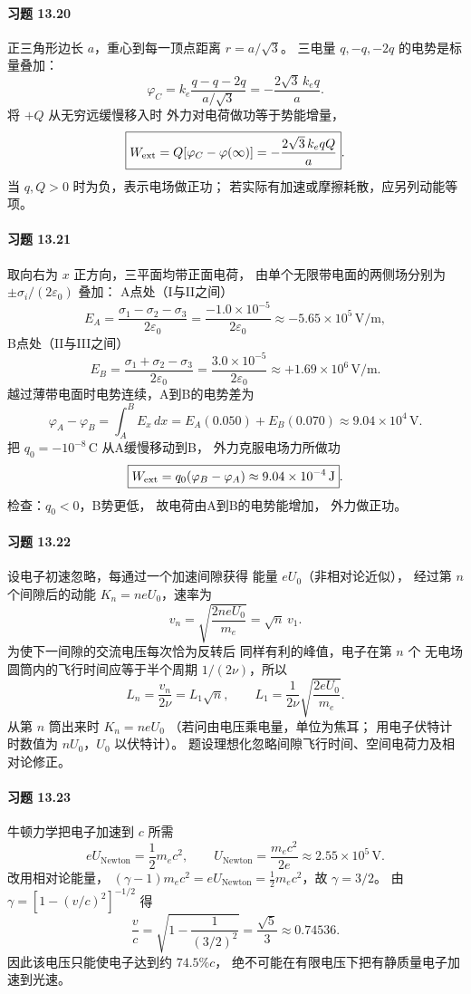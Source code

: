 \paragraph{习题 13.20}
正三角形边长 \(a\)，重心到每一顶点距离
\(r=a/\sqrt3\)。
三电量 \(q,-q,-2q\) 的电势是标量叠加：
\[
 \boxed{\varphi_C=k_e\frac{q-q-2q}{a/\sqrt3}
 =-\frac{2\sqrt3\,k_eq}{a}}.
\]
将 \(+Q\) 从无穷远缓慢移入时
外力对电荷做功等于势能增量，
\[
 \boxed{W_{\rm ext}=Q[\varphi_C-\varphi(\infty)]
 =-\frac{2\sqrt3\,k_eqQ}{a}}.
\]
当 \(q,Q>0\) 时为负，表示电场做正功；
若实际有加速或摩擦耗散，应另列动能等项。

\paragraph{习题 13.21}
取向右为 \(x\) 正方向，三平面均带正面电荷，
由单个无限带电面的两侧场分别为
\(\pm\sigma_i/(2\varepsilon_0)\) 叠加：
A点处（I与II之间）
\[
 E_A=\frac{\sigma_1-\sigma_2-\sigma_3}{2\varepsilon_0}
 =\frac{-1.0\times10^{-5}}{2\varepsilon_0}
 \approx-5.65\times10^5\,\mathrm{V/m},
\]
B点处（II与III之间）
\[
 E_B=\frac{\sigma_1+\sigma_2-\sigma_3}{2\varepsilon_0}
 =\frac{3.0\times10^{-5}}{2\varepsilon_0}
 \approx+1.69\times10^6\,\mathrm{V/m}.
\]
越过薄带电面时电势连续，A到B的电势差为
\[
 \varphi_A-\varphi_B
 =\int_A^BE_x\,dx
 =E_A(0.050)+E_B(0.070)
 \approx\boxed{9.04\times10^4\,\mathrm V}.
\]
把 \(q_0=-10^{-8}\,\mathrm C\) 从A缓慢移动到B，
外力克服电场力所做功
\[
 \boxed{W_{\rm ext}=q_0(\varphi_B-\varphi_A)
 \approx9.04\times10^{-4}\,\mathrm J}.
\]
检查：\(q_0<0\)，B势更低，
故电荷由A到B的电势能增加，
外力做正功。

\paragraph{习题 13.22}
设电子初速忽略，每通过一个加速间隙获得
能量 \(eU_0\)（非相对论近似），
经过第 \(n\) 个间隙后的动能
\(K_n=neU_0\)，速率为
\[
 v_n=\sqrt{\frac{2neU_0}{m_e}}=\sqrt n\,v_1.
\]
为使下一间隙的交流电压每次恰为反转后
同样有利的峰值，电子在第 \(n\) 个
无电场圆筒内的飞行时间应等于半个周期
\(1/(2\nu)\)，所以
\[
 \boxed{L_n=\frac{v_n}{2\nu}
 =L_1\sqrt n},\qquad
 \boxed{L_1=\frac1{2\nu}\sqrt{\frac{2eU_0}{m_e}}}.
\]
从第 \(n\) 筒出来时
\(\boxed{K_n=neU_0}\)
（若问由电压乘电量，单位为焦耳；
用电子伏特计时数值为 \(nU_0\)，\(U_0\) 以伏特计）。
题设理想化忽略间隙飞行时间、空间电荷力及相对论修正。

\paragraph{习题 13.23}
牛顿力学把电子加速到 \(c\) 所需
\[
 eU_{\mathrm{Newton}}=\frac12m_ec^2,
 \qquad
 \boxed{U_{\mathrm{Newton}}=\frac{m_ec^2}{2e}
 \approx2.55\times10^5\,\mathrm V}.
\]
改用相对论能量，
\((\gamma-1)m_ec^2=eU_{\mathrm{Newton}}
 =\frac12m_ec^2\)，故 \(\gamma=3/2\)。
由 \(\gamma=[1-(v/c)^2]^{-1/2}\) 得
\[
 \boxed{\frac vc=\sqrt{1-\frac1{(3/2)^2}}
 =\frac{\sqrt5}{3}\approx0.74536}.
\]
因此该电压只能使电子达到约
\(\boxed{74.5\%c}\)，
绝不可能在有限电压下把有静质量电子加速到光速。

